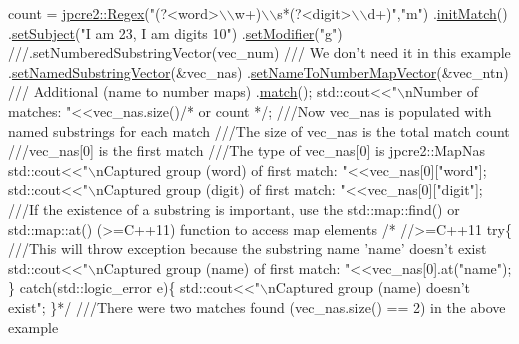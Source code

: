 \begin{DoxyCode}
\textcolor{comment}{}count = 
\hyperlink{classjpcre2_1_1Regex}{jpcre2::Regex}(\textcolor{stringliteral}{"(?<word>\(\backslash\)\(\backslash\)w+)\(\backslash\)\(\backslash\)s*(?<digit>\(\backslash\)\(\backslash\)d+)"},\textcolor{stringliteral}{"m"})
        .\hyperlink{classjpcre2_1_1Regex_a519b0915bf1163c6ce6a4d674b30cfcd}{initMatch}()
        .\hyperlink{classjpcre2_1_1RegexMatch_a635c652195deaa8ebb9e107c4f972aab}{setSubject}(\textcolor{stringliteral}{"I am 23, I am digits 10"})
        .\hyperlink{classjpcre2_1_1RegexMatch_a9df7e92f96b61553f62720cb8f5f23e5}{setModifier}(\textcolor{stringliteral}{"g"})\textcolor{comment}{}
\textcolor{comment}{        ///.setNumberedSubstringVector(vec\_num) /// We don't need it in this example}
\textcolor{comment}{}        .\hyperlink{classjpcre2_1_1RegexMatch_ae495431f57cae54363331237ab21b56c}{setNamedSubstringVector}(&vec\_nas)
        .\hyperlink{classjpcre2_1_1RegexMatch_a04926e61d8b5f1d8bdf344efecd567d8}{setNameToNumberMapVector}(&vec\_ntn) \textcolor{comment}{/// Additional (name to number maps)}
\textcolor{comment}{}        .\hyperlink{classjpcre2_1_1RegexMatch_a5868aef3a146594ea1ebef34d122bb33}{match}();
std::cout<<\textcolor{stringliteral}{"\(\backslash\)nNumber of matches: "}<<vec\_nas.size()\textcolor{comment}{/* or count */};\textcolor{comment}{}
\textcolor{comment}{///Now vec\_nas is populated with named substrings for each match}
\textcolor{comment}{///The size of vec\_nas is the total match count}
\textcolor{comment}{///vec\_nas[0] is the first match}
\textcolor{comment}{///The type of vec\_nas[0] is jpcre2::MapNas}
\textcolor{comment}{}std::cout<<\textcolor{stringliteral}{"\(\backslash\)nCaptured group (word) of first match: "}<<vec\_nas[0][\textcolor{stringliteral}{"word"}];
std::cout<<\textcolor{stringliteral}{"\(\backslash\)nCaptured group (digit) of first match: "}<<vec\_nas[0][\textcolor{stringliteral}{"digit"}];
\textcolor{comment}{}
\textcolor{comment}{///If the existence of a substring is important, use the std::map::find() or std::map::at() (>=C++11)
       function to access map elements}
\textcolor{comment}{}\textcolor{comment}{/* //>=C++11}
\textcolor{comment}{try\{}\textcolor{comment}{}
\textcolor{comment}{    ///This will throw exception because the substring name 'name' doesn't exist}
\textcolor{comment}{}    std::cout<<"\(\backslash\)nCaptured group (name) of first match: "<<vec\_nas[0].at("name");
\} catch(std::logic\_error e)\{
    std::cout<<"\(\backslash\)nCaptured group (name) doesn't exist";
\}*/
\textcolor{comment}{}
\textcolor{comment}{///There were two matches found (vec\_nas.size() == 2) in the above example}

\end{DoxyCode}
